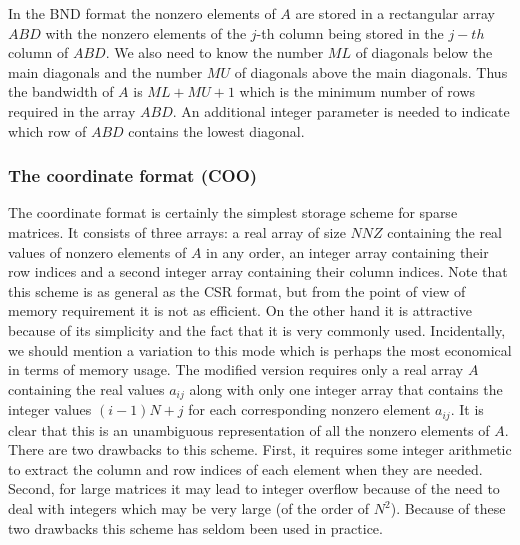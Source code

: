 
In the BND format the nonzero elements of $A$ are stored in a
rectangular array $ABD$ with the nonzero elements of the $j$-th column
being stored in the $j-th$ column of $ABD$. We also need to know the
number $ML$ of diagonals below the main diagonals and the number $MU$
of diagonals above the main diagonals. Thus the bandwidth of $A$ is
$ML+MU+1$ which is the minimum number of rows required in the array
$ABD$. An additional integer parameter is needed to indicate which row
of $ABD$ contains the lowest diagonal.

\subsubsection{The coordinate format (COO) } 

The coordinate format is certainly the simplest storage scheme for
sparse matrices. It consists of three arrays: a real array of size
$NNZ$ containing the real values of nonzero elements of $A$ in any
order, an integer array containing their row indices and a second
integer array containing their column indices. Note that this scheme
is as general as the CSR format, but from the point of view of memory
requirement it is not as efficient.  On the other hand it is
attractive because of its simplicity and the fact that it is very
commonly used.  Incidentally, we should mention a variation to this
mode which is perhaps the most economical in terms of memory usage.
The modified version requires only a real array $A$ containing the
real values $a_{ij}$ along with only one integer array that contains
the integer values $ (i-1)N + j$ for each corresponding nonzero
element $a_{ij}$.  It is clear that this is an unambiguous
representation of all the nonzero elements of $A$.  There are two
drawbacks to this scheme. First, it requires some integer arithmetic
to extract the column and row indices of each element when they are
needed. Second, for large matrices it may lead to integer overflow
because of the need to deal with integers which may be very large (of
the order of $N^2$).  Because of these two drawbacks this scheme has
seldom been used in practice.


